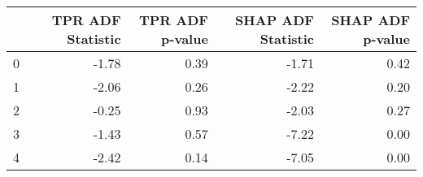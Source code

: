 \begin{tabular}{lrrrr}
\toprule
 & TPR ADF Statistic & TPR ADF p-value & SHAP ADF Statistic & SHAP ADF p-value \\
\midrule
0 & -1.78 & 0.39 & -1.71 & 0.42 \\
1 & -2.06 & 0.26 & -2.22 & 0.20 \\
2 & -0.25 & 0.93 & -2.03 & 0.27 \\
3 & -1.43 & 0.57 & -7.22 & 0.00 \\
4 & -2.42 & 0.14 & -7.05 & 0.00 \\
\bottomrule
\end{tabular}
